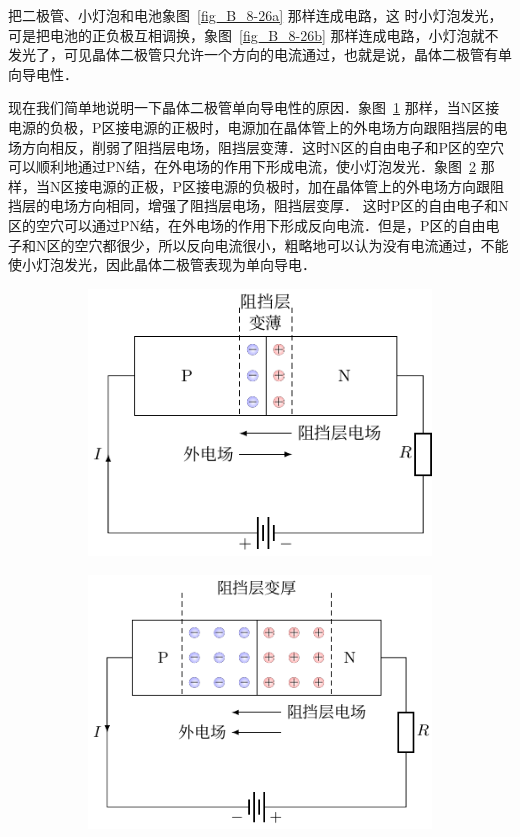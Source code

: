 把二极管、小灯泡和电池象图~\ref{fig_B_8-26a} 那样连成电路，这
时小灯泡发光，可是把电池的正负极互相调换，象图~\ref{fig_B_8-26b} 那样连成电路，小灯泡就不发光了，可见晶体二极管只允许一个方向的电流通过，也就是说，晶体二极管有单向导电性．

现在我们简单地说明一下晶体二极管单向导电性的原因．象图~\ref{fig_B_8-27a} 那样，当N区接电源的负极，P区接电源的正极时，电源加在晶体管上的外电场方向跟阻挡层的电场方向相反，削弱了阻挡层电场，阻挡层变薄．这时N区的自由电子和P区的空穴可以顺利地通过PN结，在外电场的作用下形成电流，使小灯泡发光．象图~\ref{fig_B_8-27b} 那样，当N区接电源的正极，P区接电源的负极时，加在晶体管上的外电场方向跟阻挡层的电场方向相同，增强了阻挡层电场，阻挡层变厚．
这时P区的自由电子和N区的空穴可以通过PN结，在外电场的作用下形成反向电流．但是，P区的自由电子和N区的空穴都很少，所以反向电流很小，粗略地可以认为没有电流通过，不能使小灯泡发光，因此晶体二极管表现为单向导电．
\begin{figure}[htbp]
    \centering
    \begin{subfigure}{0.48\linewidth}
        \centering
        \includegraphics{fig/B/8-27a.pdf}
        \caption{}\label{fig_B_8-27a}
    \end{subfigure}
    \hfil
    \begin{subfigure}{0.48\linewidth}
        \centering
        \includegraphics{fig/B/8-27b.pdf}
        \caption{}\label{fig_B_8-27b}
    \end{subfigure}
    \caption{}\label{fig_B_8-27}
\end{figure}

